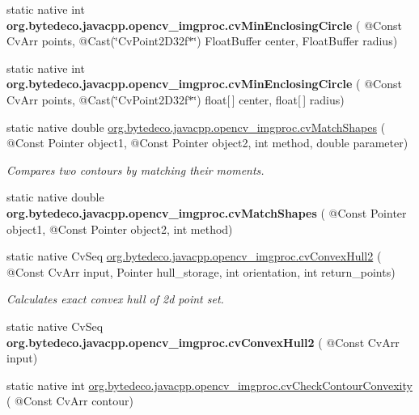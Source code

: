 \begin{DoxyCompactItemize}
\mbox{\label{group__imgproc__c_ga5c05cbe11f11e62c1b8d3c747b5c916f}} 
static native int {\bfseries org.\+bytedeco.\+javacpp.\+opencv\+\_\+imgproc.\+cv\+Min\+Enclosing\+Circle} ( @Const Cv\+Arr points, @Cast(\char`\"{}Cv\+Point2\+D32f$\ast$\char`\"{}) Float\+Buffer center, Float\+Buffer radius)
\item 
\mbox{\label{group__imgproc__c_gab38e3b1cb4e483a82c926b31ccc4c1c9}} 
static native int {\bfseries org.\+bytedeco.\+javacpp.\+opencv\+\_\+imgproc.\+cv\+Min\+Enclosing\+Circle} ( @Const Cv\+Arr points, @Cast(\char`\"{}Cv\+Point2\+D32f$\ast$\char`\"{}) float\mbox{[}$\,$\mbox{]} center, float\mbox{[}$\,$\mbox{]} radius)
\item 
static native double \hyperlink{group__imgproc__c_gab9210add45c3838c6939630bb55fa97f}{org.\+bytedeco.\+javacpp.\+opencv\+\_\+imgproc.\+cv\+Match\+Shapes} ( @Const Pointer object1, @Const Pointer object2, int method, double parameter)
\begin{DoxyCompactList}\small\item\em Compares two contours by matching their moments. \end{DoxyCompactList}\item 
\mbox{\label{group__imgproc__c_gabcfb05218bcb9617ab3ab65afd8eac53}} 
static native double {\bfseries org.\+bytedeco.\+javacpp.\+opencv\+\_\+imgproc.\+cv\+Match\+Shapes} ( @Const Pointer object1, @Const Pointer object2, int method)
\item 
static native Cv\+Seq \hyperlink{group__imgproc__c_ga97e54b0658572d02cdef5ae91799499d}{org.\+bytedeco.\+javacpp.\+opencv\+\_\+imgproc.\+cv\+Convex\+Hull2} ( @Const Cv\+Arr input, Pointer hull\+\_\+storage, int orientation, int return\+\_\+points)
\begin{DoxyCompactList}\small\item\em Calculates exact convex hull of 2d point set. \end{DoxyCompactList}\item 
\mbox{\label{group__imgproc__c_gac47301315e94ca4f6e46206efb5579bd}} 
static native Cv\+Seq {\bfseries org.\+bytedeco.\+javacpp.\+opencv\+\_\+imgproc.\+cv\+Convex\+Hull2} ( @Const Cv\+Arr input)
\item 
static native int \hyperlink{group__imgproc__c_ga178a23955341ae86d5a45b1e1c71f7f7}{org.\+bytedeco.\+javacpp.\+opencv\+\_\+imgproc.\+cv\+Check\+Contour\+Convexity} ( @Const Cv\+Arr contour)

\end{DoxyCompactItemize}
